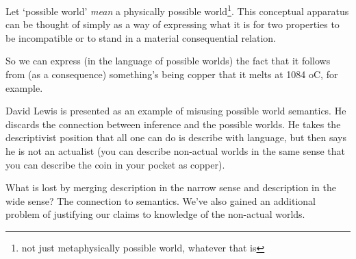 Let `possible world' \emph{mean} a physically possible world\footnote{not just metaphysically possible world, whatever that is}. This conceptual apparatus can be thought of  simply as a way of expressing what it is for two properties to be incompatible or to stand in a material consequential relation.

So we can express (in the language of possible worlds) the fact that it follows from (as a consequence) something's being copper that it melts at 1084 oC, for example.

David Lewis is presented as an example of misusing possible world semantics. He discards the connection between inference and the possible worlds. He takes the descriptivist position that all one can do is describe with language, but then says he is not an actualist (you can describe non-actual worlds in the same sense that you can describe the coin in your pocket as copper).

What is lost by merging description in the narrow sense and description in the wide sense? The connection to semantics. We've also gained an additional problem of justifying our claims to knowledge of the non-actual worlds.